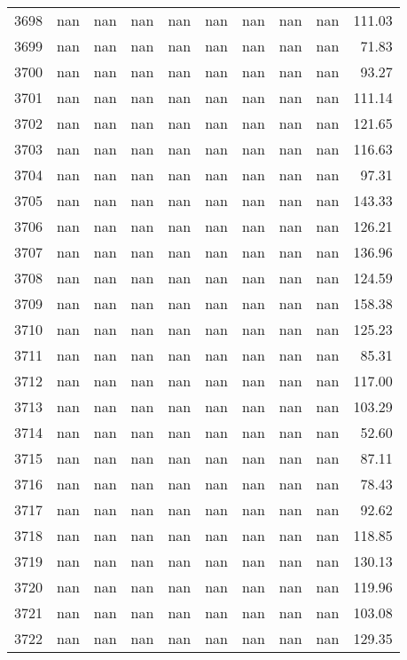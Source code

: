 \begin{tabular}{lrrrrrrrrr}
3698 & nan & nan & nan & nan & nan & nan & nan & nan & 111.03 \\
3699 & nan & nan & nan & nan & nan & nan & nan & nan & 71.83 \\
3700 & nan & nan & nan & nan & nan & nan & nan & nan & 93.27 \\
3701 & nan & nan & nan & nan & nan & nan & nan & nan & 111.14 \\
3702 & nan & nan & nan & nan & nan & nan & nan & nan & 121.65 \\
3703 & nan & nan & nan & nan & nan & nan & nan & nan & 116.63 \\
3704 & nan & nan & nan & nan & nan & nan & nan & nan & 97.31 \\
3705 & nan & nan & nan & nan & nan & nan & nan & nan & 143.33 \\
3706 & nan & nan & nan & nan & nan & nan & nan & nan & 126.21 \\
3707 & nan & nan & nan & nan & nan & nan & nan & nan & 136.96 \\
3708 & nan & nan & nan & nan & nan & nan & nan & nan & 124.59 \\
3709 & nan & nan & nan & nan & nan & nan & nan & nan & 158.38 \\
3710 & nan & nan & nan & nan & nan & nan & nan & nan & 125.23 \\
3711 & nan & nan & nan & nan & nan & nan & nan & nan & 85.31 \\
3712 & nan & nan & nan & nan & nan & nan & nan & nan & 117.00 \\
3713 & nan & nan & nan & nan & nan & nan & nan & nan & 103.29 \\
3714 & nan & nan & nan & nan & nan & nan & nan & nan & 52.60 \\
3715 & nan & nan & nan & nan & nan & nan & nan & nan & 87.11 \\
3716 & nan & nan & nan & nan & nan & nan & nan & nan & 78.43 \\
3717 & nan & nan & nan & nan & nan & nan & nan & nan & 92.62 \\
3718 & nan & nan & nan & nan & nan & nan & nan & nan & 118.85 \\
3719 & nan & nan & nan & nan & nan & nan & nan & nan & 130.13 \\
3720 & nan & nan & nan & nan & nan & nan & nan & nan & 119.96 \\
3721 & nan & nan & nan & nan & nan & nan & nan & nan & 103.08 \\
3722 & nan & nan & nan & nan & nan & nan & nan & nan & 129.35 \\

\end{tabular}
